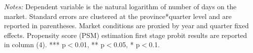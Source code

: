 \documentclass[12pt]{article}
\begin{document}
\begin{table}[H]
\begin{tabular}{lcccc}
\hline

    \end{tabular}%
\begin{tablenotes}
\scriptsize
\item \textit{Notes:} Dependent variable is the natural logarithm of number of days on the market. Standard errors are clustered at the province*quarter level and are reported in parentheses.  Market conditions are proxied by year and quarter fixed effects. Propensity score (PSM) estimation first stage probit results are reported in column (4).   *** p$<$0.01, ** p$<$0.05, * p$<$0.1.
\end{tablenotes}

  \label{tab:addlabel}%
\end{table}%






\newpage
\end{document}
